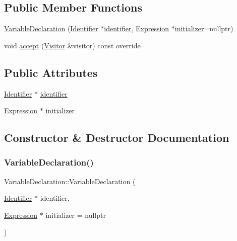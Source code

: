 \subsection*{Public Member Functions}
\begin{DoxyCompactItemize}
\item 
\hyperlink{struct_variable_declaration_ab1ee3bba021d48bca4da042a32873655}{Variable\+Declaration} (\hyperlink{struct_identifier}{Identifier} $\ast$\hyperlink{struct_variable_declaration_af00ca23e243d1ab865fd094c9be7a5c9}{identifier}, \hyperlink{struct_expression}{Expression} $\ast$\hyperlink{struct_variable_declaration_a472faa13a27b5cc06125787259116a2f}{initializer}=nullptr)
\item 
void \hyperlink{struct_variable_declaration_abdf0b5eed5200357de1bd9bf5ce6f6b3}{accept} (\hyperlink{struct_visitor}{Visitor} \&visitor) const override
\end{DoxyCompactItemize}
\subsection*{Public Attributes}
\begin{DoxyCompactItemize}
\item 
\hyperlink{struct_identifier}{Identifier} $\ast$ \hyperlink{struct_variable_declaration_af00ca23e243d1ab865fd094c9be7a5c9}{identifier}
\item 
\hyperlink{struct_expression}{Expression} $\ast$ \hyperlink{struct_variable_declaration_a472faa13a27b5cc06125787259116a2f}{initializer}
\end{DoxyCompactItemize}


\subsection{Constructor \& Destructor Documentation}
\mbox{\label{struct_variable_declaration_ab1ee3bba021d48bca4da042a32873655}} 
\subsubsection{\texorpdfstring{Variable\+Declaration()}{VariableDeclaration()}}
{\footnotesize\ttfamily Variable\+Declaration\+::\+Variable\+Declaration (\begin{DoxyParamCaption}\item[{\hyperlink{struct_identifier}{Identifier} $\ast$}]{identifier,  }\item[{\hyperlink{struct_expression}{Expression} $\ast$}]{initializer = {\ttfamily nullptr} }\end{DoxyParamCaption})\hspace{0.3cm}{\ttfamily [inline]}}



